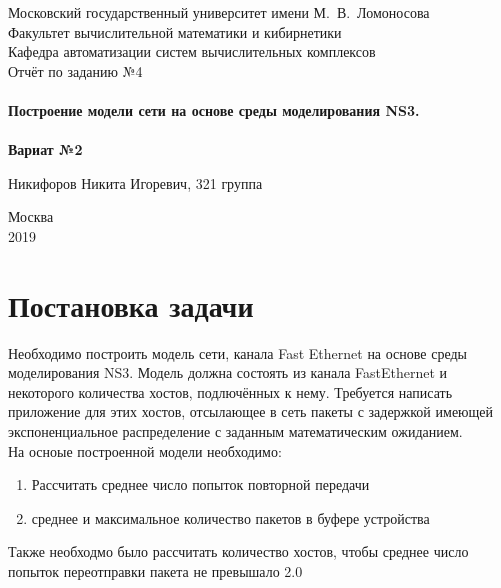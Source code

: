 \documentclass[a4peper, 12pt, titlepage, finall]{extreport}
\begin{document}
    \begin{titlepage}
        \begin{center}
            {\small \sc Московский государственный университет имени М.~В.~Ломоносова\\
            Факультет вычислительной математики и кибирнетики\\
            Кафедра автоматизации систем вычислительных комплексов\\}
            \vfill
            {\large \sc Отчёт по заданию №4}\\~\\

            {\large \bf Построение модели сети на основе среды моделирования NS3.}\\~\\

            {\large \bf Вариат №2}
        \end{center}
        
        \begin{flushright}
            \vfill
            {Никифоров Никита Игоревич, 321 группа}
        \end{flushright}

        \begin{center}
            \vfill
            {\small Москва\\2019}
        \end{center}
    \end{titlepage}

    \tableofcontents
    \newpage

    \section{Постановка задачи}
        Необходимо построить модель сети, канала Fast Ethernet на основе среды моделирования NS3. 
        Модель должна состоять из канала FastEthernet и некоторого количества хостов, подлючённых к нему.
        Требуется написать приложение для этих хостов, отсылающее в сеть пакеты с задержкой имеющей экспоненциальное распределение
        с заданным математическим ожиданием.\\
        На осноые построенной модели необходимо:
        \begin{enumerate}
            \item Рассчитать среднее число попыток повторной передачи
            \item среднее и максимальное количество пакетов в буфере устройства
        \end{enumerate}
        Также необходмо было рассчитать количество хостов, чтобы среднее число попыток переотправки пакета не превышало 2.0
\end{document}
